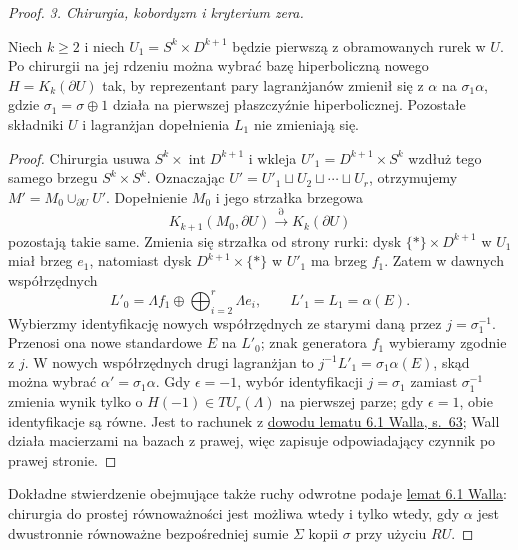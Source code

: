 \begin{proof}
\emph{3. Chirurgia, kobordyzm i kryterium zera.}
\begin{lemat}
\label{lem:wall-odd-surgery-22}
Niech $k\geq2$ i niech $U_1=S^k\times D^{k+1}$
będzie pierwszą z obramowanych rurek w $U$.
Po chirurgii na jej rdzeniu można wybrać bazę
hiperboliczną nowego $H=K_k(\partial U)$ tak,
by reprezentant pary lagranżjanów zmienił się
z $\alpha$ na $\sigma_1\alpha$, gdzie
$\sigma_1=\sigma\oplus 1$ działa na pierwszej
płaszczyźnie hiperbolicznej. Pozostałe składniki
$U$ i lagranżjan dopełnienia $L_1$ nie zmieniają się.
\end{lemat}
\begin{proof}
Chirurgia usuwa $S^k\times\operatorname{int}D^{k+1}$
i wkleja $U'_1=D^{k+1}\times S^k$ wzdłuż tego samego
brzegu $S^k\times S^k$. Oznaczając
$U' = U'_1\sqcup U_2\sqcup\cdots\sqcup U_r$,
otrzymujemy $M'=M_0\cup_{\partial U}U'$.
Dopełnienie $M_0$ i jego strzałka brzegowa
\[
 K_{k+1}(M_0,\partial U)\xrightarrow{\partial}
 K_k(\partial U)
\]
pozostają takie same. Zmienia się strzałka
od strony rurki: dysk $\{*\}\times D^{k+1}$
w $U_1$ miał brzeg $e_1$, natomiast dysk
$D^{k+1}\times\{*\}$ w $U'_1$ ma brzeg $f_1$.
Zatem w dawnych współrzędnych
\[
 L'_0=\Lambda f_1\oplus
       \bigoplus_{i=2}^r\Lambda e_i,
 \qquad L'_1=L_1=\alpha(E).
\]
Wybierzmy identyfikację nowych współrzędnych
ze starymi daną przez $j=\sigma_1^{-1}$.
Przenosi ona nowe standardowe $E$ na $L'_0$;
znak generatora $f_1$ wybieramy zgodnie z $j$.
W nowych współrzędnych drugi lagranżjan to
$j^{-1}L'_1=\sigma_1\alpha(E)$, skąd można
wybrać $\alpha'=\sigma_1\alpha$.
Gdy $\epsilon=-1$, wybór identyfikacji
$j=\sigma_1$ zamiast $\sigma_1^{-1}$ zmienia
wynik tylko o $H(-1)\in TU_r(\Lambda)$
na pierwszej parze; gdy $\epsilon=1$, obie
identyfikacje są równe. Jest to rachunek z
\href{https://www.maths.ed.ac.uk/~v1ranick/books/scm.pdf}
{dowodu lematu 6.1 Walla, s.~63}; Wall działa
macierzami na bazach z prawej, więc zapisuje
odpowiadający czynnik po prawej stronie.
\end{proof}

Dokładne stwierdzenie obejmujące także ruchy
odwrotne podaje
\href{https://www.maths.ed.ac.uk/~v1ranick/books/scm.pdf}
{lemat 6.1 Walla}: chirurgia do prostej
równoważności jest możliwa wtedy i tylko wtedy,
gdy $\alpha$ jest dwustronnie równoważne
bezpośredniej sumie $\Sigma$ kopii $\sigma$
przy użyciu $RU$.


\end{proof}
